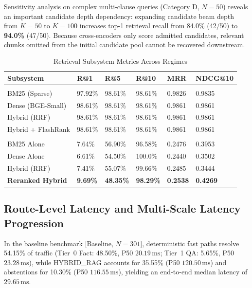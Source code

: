 \documentclass[journal]{IEEEtran}
\newcommand{\ms}{\,\mathrm{ms}}
\begin{document}
Sensitivity analysis on complex multi-clause queries (Category D, $N=50$) reveals an important candidate depth dependency: expanding candidate beam depth from $K=50$ to $K=100$ increases top-1 retrieval recall from 84.0\% (42/50) to \textbf{94.0\%} (47/50). Because cross-encoders only score admitted candidates, relevant chunks omitted from the initial candidate pool cannot be recovered downstream.

\begin{table}[!t]
\caption{Retrieval Subsystem Metrics Across Regimes}
\label{tab:retrieval}
\centering
\scriptsize
\setlength{\tabcolsep}{1.8pt}
\renewcommand{\arraystretch}{0.85}
\begin{tabularx}{\columnwidth}{>{\raggedright\arraybackslash}p{2.3cm}YYYYY}
\toprule
\textbf{Subsystem} & \textbf{R@1} & \textbf{R@5} & \textbf{R@10} & \textbf{MRR} & \textbf{NDCG@10}\\
\midrule
{}\\
BM25 (Sparse) & 97.92\% & 98.61\% & 98.61\% & 0.9826 & 0.9835\\
Dense (BGE-Small) & 98.61\% & 98.61\% & 98.61\% & 0.9861 & 0.9861\\
Hybrid (RRF) & 98.61\% & 98.61\% & 98.61\% & 0.9861 & 0.9861\\
Hybrid + FlashRank & 98.61\% & 98.61\% & 98.61\% & 0.9861 & 0.9861\\
\midrule
{}\\
BM25 Alone & 7.64\% & 56.90\% & 96.58\% & 0.2476 & 0.3953\\
Dense Alone & 6.61\% & 54.50\% & 100.0\% & 0.2440 & 0.3502\\
Hybrid (RRF) & 7.41\% & 55.07\% & 99.66\% & 0.2485 & 0.3444\\
\textbf{Reranked Hybrid} & \textbf{9.69\%} & \textbf{48.35\%} & \textbf{98.29\%} & \textbf{0.2538} & \textbf{0.4269}\\
\bottomrule
\end{tabularx}
\end{table}

\subsection{Route-Level Latency and Multi-Scale Latency Progression}
In the baseline benchmark [Baseline, $N=301$], deterministic fast paths resolve 54.15\% of traffic (Tier~0 Fact: 48.50\%, P50 $20.19\ms$; Tier~1 QA: 5.65\%, P50 $23.28\ms$), while HYBRID\_RAG accounts for 35.55\% (P50 $120.50\ms$) and abstentions for 10.30\% (P50 $116.55\ms$), yielding an end-to-end median latency of $29.65\ms$.
\end{document}
